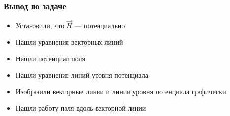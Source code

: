 \begin{frame}\frametitle{Вывод по задаче}
	\begin{itemize}
		\item Установили, что \(\vec H\) --- потенциально
		\item Нашли уравнения векторных линий
		\item Нашли потенциал поля
		\item Нашли уравнение линий уровня потенциала
		\item Изобразили векторные линии и линии уровня потенциала графически
		\item Нашли работу поля вдоль векторной линии
	\end{itemize}
\end{frame}
